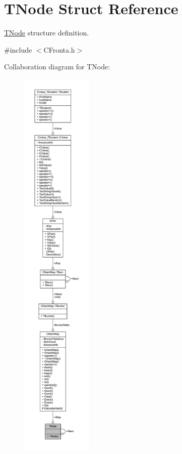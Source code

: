 \hypertarget{struct_t_node}{}\section{T\+Node Struct Reference}
\label{struct_t_node}


\hyperlink{struct_t_node}{T\+Node} structure definition.  




{\ttfamily \#include $<$C\+Fronta.\+h$>$}



Collaboration diagram for T\+Node\+:\nopagebreak
\begin{figure}[H]
\begin{center}
\leavevmode
\includegraphics[height=550pt]{struct_t_node__coll__graph}
\end{center}
\end{figure}
